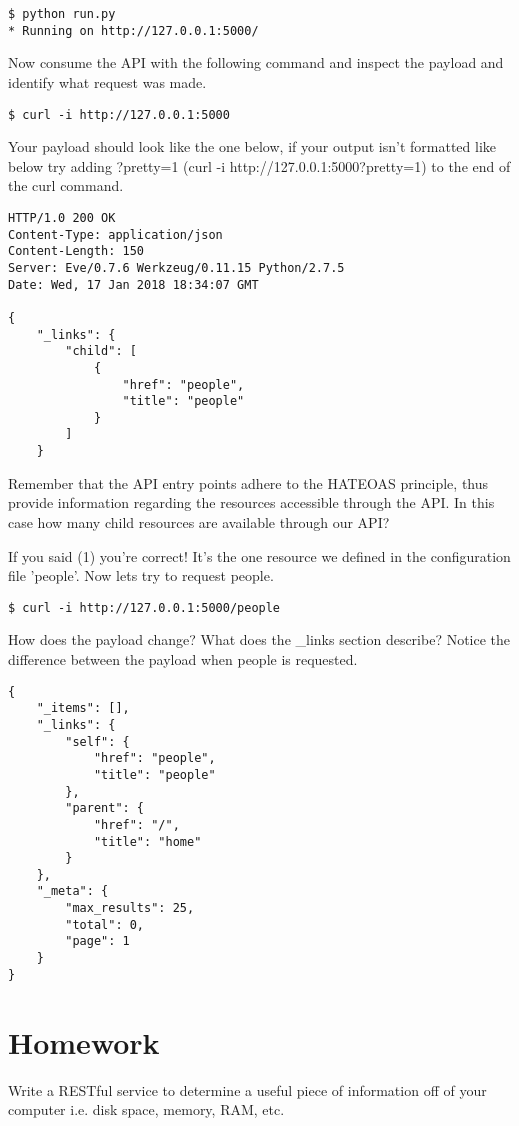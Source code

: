 \documentclass{article}
\begin{document}
\begin{verbatim}
$ python run.py
* Running on http://127.0.0.1:5000/
\end{verbatim}

Now consume the API with the following command and inspect the payload and identify what request was made.

\begin{verbatim}
$ curl -i http://127.0.0.1:5000
\end{verbatim}

Your payload should look like the one below, if your output isn't formatted like below try adding ?pretty=1 (curl -i http://127.0.0.1:5000?pretty=1) to the end of the curl command.
\begin{verbatim}
HTTP/1.0 200 OK
Content-Type: application/json
Content-Length: 150
Server: Eve/0.7.6 Werkzeug/0.11.15 Python/2.7.5
Date: Wed, 17 Jan 2018 18:34:07 GMT

{
    "_links": {
        "child": [
            {
                "href": "people",
                "title": "people"
            }
        ]
    }
\end{verbatim}

Remember that the API entry points adhere to the HATEOAS principle, thus provide information regarding the resources accessible through the API. In this case how many child resources are available through our API? 

\vspace{5mm}

If you said (1) you're correct! It's the one resource we defined in the configuration file 'people'. Now lets try to request people.

\begin{verbatim}
$ curl -i http://127.0.0.1:5000/people
\end{verbatim}

How does the payload change? What does the \_links section describe? Notice the difference between the payload when people is requested.

\begin{verbatim}
{
    "_items": [],
    "_links": {
        "self": {
            "href": "people",
            "title": "people"
        },
        "parent": {
            "href": "/",
            "title": "home"
        }
    },
    "_meta": {
        "max_results": 25,
        "total": 0,
        "page": 1
    }
}
\end{verbatim}


\section{Homework}
Write a RESTful service to determine a useful piece of information off of your computer i.e. disk space, memory, RAM, etc.  
\end{document}
